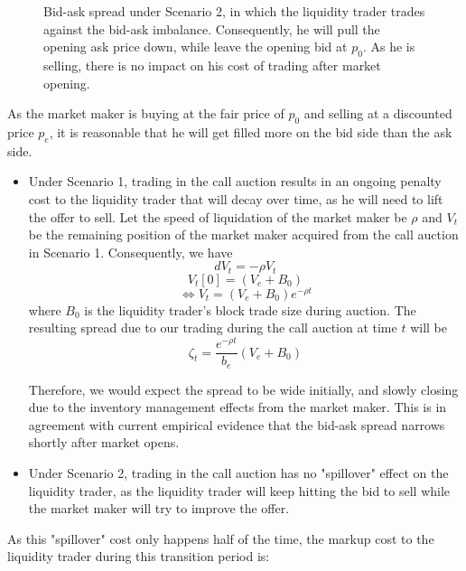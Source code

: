\documentclass{article}
\begin{document}
\begin{itemize}
{\begin{figure}[h]
          \caption{Bid-ask spread under Scenario 2, in which the liquidity trader trades against the bid-ask imbalance. Consequently, he will pull the opening ask price down, while leave the opening bid at $p_0$. As he is selling, there is no impact on his cost of trading after market opening.}
          \label{fig:mm_pricing_transition_s2}
        \end{figure}
        }
\end{itemize}
As the market maker is buying at the fair price of $p_0$ and selling at a discounted price $p_e$, it is reasonable that he will get filled more on the bid side than the ask side.

\begin{itemize}
  \item Under Scenario 1, trading in the call auction results in an ongoing penalty cost to the liquidity trader that will decay over time, as he will need to lift the offer to sell. Let the speed of liquidation of the market maker be $\rho$ and $V_t$ be the remaining position of the market maker acquired from the call auction in Scenario 1. Consequently, we have
        \[
          dV_t = -\rho V_t
        \]
        \[
          V_t[0]=(V_e + B_0)
        \]
        \begin{equation}\label{eqn:recovery_term_eqb}
          \Leftrightarrow V_t = (V_e + B_0) e^{-\rho t}
        \end{equation}
        where $B_0$ is the liquidity trader's block trade size during auction. The resulting spread due to our trading during the call auction at time $t$ will be
        \begin{equation}\label{resilence_term}
          \zeta_t = \frac{e^{-\rho t}}{b_e}  (V_e + B_0)
        \end{equation}

        Therefore, we would expect the spread to be wide initially, and slowly closing due to the inventory management effects from the market maker. This is in agreement with current empirical evidence that the bid-ask spread narrows shortly after market opens.
  \item Under Scenario 2, trading in the call auction has no "spillover" effect on the liquidity trader, as the liquidity trader will keep hitting the bid to sell while the market maker will try to improve the offer.
\end{itemize}

As this "spillover" cost only happens half of the time, the markup cost to the liquidity trader during this transition period is:
\end{document}
